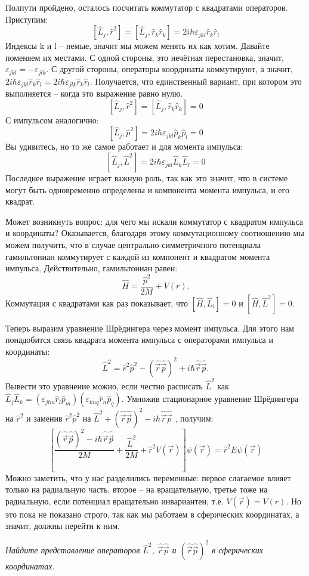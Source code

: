 Полпути пройдено, осталось посчитать коммутатор с квадратами операторов. Приступим:
\[
\left[\hat{L}_j, \hat{r}^2\right] = \left[\hat{L}_j, \hat{r}_k\hat{r}_k\right] = 2i\hbar\varepsilon_{jkl}\hat{r}_k\hat{r}_l
\]
Индексы k и l -- немые, значит мы можем менять их как хотим. Давайте поменяем их местами. С одной стороны, это нечётная перестановка, значит, $\varepsilon_{jkl} = -\varepsilon_{jlk}$. С другой стороны, операторы координаты коммутируют, а значит, $2i\hbar\varepsilon_{jkl}\hat{r}_k\hat{r}_l = 2i\hbar\varepsilon_{jlk}\hat{r}_k\hat{r}_l$. Получается, что единственный вариант, при котором это выполняется -- когда это выражение равно нулю.
\[
\left[\hat{L}_j, \hat{r}^2\right] = \left[\hat{L}_j, \hat{r}_k\hat{r}_k\right] = 0
\]
С импульсом аналогично:
\[
\left[\hat{L}_j, \hat{p}^2\right] = 2i\hbar\varepsilon_{jkl}\hat{p}_k\hat{p}_l = 0
\]
Вы удивитесь, но то же самое работает и для момента импульса:
\[
\left[\hat{L}_j, \hat{L}^2\right] = 2i\hbar\varepsilon_{jkl}\hat{L}_k\hat{L}_l = 0
\]
Последнее выражение играет важную роль, так как это значит, что в системе могут быть одновременно определены и компонента момента импульса, и его квадрат.

Может возникнуть вопрос: для чего мы искали коммутатор с квадратом импульса и координаты? Оказывается, благодаря этому коммутационному соотношению мы можем получить, что в случае центрально-симметричного потенциала гамильтониан коммутирует с каждой из компонент и квадратом момента импульса. Действительно, гамильтониан равен: 
\[
\hat{H} = \frac{\hat{p}^2}{2M} + V(r).
\]
Коммутация с квадратами как раз показывает, что $\left[\hat{H}, \hat{L}_i\right] = 0$ и $\left[\hat{H}, \hat{L}^2\right] = 0$. 

Теперь выразим уравнение Шрёдингера через момент импульса. Для этого нам понадобится связь квадрата момента импульса с операторами импульса и координаты:
\[
\hat{L}^2 = \hat{r}^2\hat{p}^2 - (\hat{\Vec{r}}\hat{\Vec{p}})^2 + i\hbar\hat{\Vec{r}}\hat{\Vec{p}}.
\]
Вывести это уравнение можно, если честно расписать $\hat{L}^2$ как $\hat{L}_j\hat{L}_k = (\varepsilon_{jlm}\hat{r}_l\hat{p}_m)(\varepsilon_{knq}\hat{r}_n\hat{p}_q)$. Умножив стационарное уравнение Шрёдингера на $\hat{r}^2$ и заменив $\hat{r}^2\hat{p}^2$ на $\hat{L}^2 + (\hat{\Vec{r}}\hat{\Vec{p}})^2 - i\hbar\hat{\Vec{r}}\hat{\Vec{p}}$ , получим:
\[
\left[\frac{(\hat{\Vec{r}}\hat{\Vec{p}})^2 - i\hbar\hat{\Vec{r}}\hat{\Vec{p}}}{2M} + \frac{\hat{L}^2}{2M} + \hat{r}^2 V(\Vec{r})\right]\psi(\Vec{r}) = \hat{r}^2 E\psi(\Vec{r})
\]
Можно заметить, что у нас разделились переменные: первое слагаемое влияет только на радиальную часть, второе -- на вращательную, третье тоже на радиальную, если потенциал вращательно инвариантен, т.е. $V(\Vec{r}) = V(r)$. Но это пока не показано строго, так как мы работаем в сферических координатах, а значит, должны перейти к ним.
\begin{center}
    \textit{Найдите представление операторов $\hat{L}^2$, $\hat{\Vec{r}}\hat{\Vec{p}}$ и $(\hat{\Vec{r}}\hat{\Vec{p}})^2$ в сферических координатах.}
\end{center}

